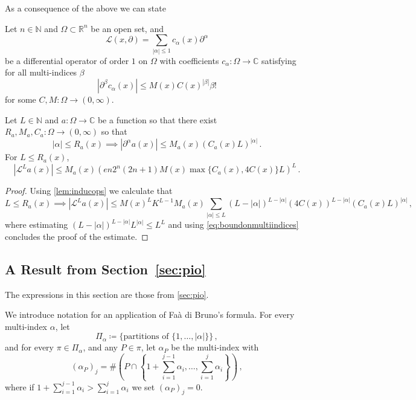 \documentclass[
	fontsize=11pt, 
	twoside=false, 
	abstract=true, 
	a4paper,
]{scrartcl}
\newcommand{\RR}{\mathbb{R}}
\newcommand{\CC}{\mathbb{C}}
\newcommand{\abs}[1]{\left\lvert#1\right\rvert}
\newcommand{\del}{\partial}
\begin{document}
As a consequence of the above we can state
\begin{corollary}\label{cor:repeatL}
	Let $n\in\mathbb{N}$ and $\Omega \subset \RR^n$ be an open set, and
	\[
		\mathcal{L}(x,\del) = \sum_{\abs{\alpha}\leq 1} c_{\alpha}(x)\del^\alpha
	\]
	be a differential operator of order $1$ on $\Omega$ with coefficients $c_{\alpha} \colon \Omega\to \CC$ satisfying for all multi-indices $\beta$
	\[
		\abs{\del^\beta c_{\alpha}(x)} \leq M(x) C(x)^{\abs{\beta}} \beta!
	\]
	for some $C,M\colon \Omega \to (0,\infty)$.

	Let $L\in\mathbb{N}$ and $a \colon \Omega \to \CC$ be a function so that there exist $R_a,M_a,C_a \colon \Omega \to (0,\infty)$ so that
	\[
		\abs{\alpha}\leq R_a(x)\implies \abs{\del^\alpha a(x)} \leq M_a(x) (C_a(x)L)^{\abs{\alpha}}\,.
	\]
	For $L\leq R_a(x)$,
	\[
		\abs{\mathcal{L}^L a(x)} \leq M_a(x) \left(en2^n(2n+1) M(x) \max\{C_a(x), 4C(x)\}L\right)^L\,.
	\]
\end{corollary}
\begin{proof}
	Using \cref{lem:inducops} we calculate that 
	\[ 
		L \leq R_a(x)\implies \abs{\mathcal{L}^L a(x)} \leq M(x)^L K^{L-1}M_a(x) \sum_{\abs{\alpha}\leq L} (L-\abs{\alpha})^{L-\abs{\alpha}}(4C(x))^{L-\abs{\alpha}} (C_a(x) L)^{\abs{\alpha}}\,,
	\]
	where estimating $(L-\abs{\alpha})^{L-\abs{\alpha}}L^{\abs{\alpha}} \leq L^L$ and using \cref{eq:boundonmultiindices} concludes the proof of the estimate.
\end{proof}

\subsection{A Result from Section~\ref{sec:pio}}\label{sec:proofspio}

The expressions in this section are those from \cref{sec:pio}. 

We introduce notation for an application of Fa\`a di Bruno's formula. For every multi-index $\alpha$, let
\begin{equation}\label{eq:defPialpha}
	\Pi_\alpha \coloneqq \{\text{partitions of } \{1,\dots,\abs{\alpha}\}\}\,,
\end{equation}
and for every $\pi \in \Pi_\alpha$, and any $P \in \pi$, let $\alpha_P$ be the multi-index with 
\begin{equation}
	(\alpha_P)_j = \#\left(P\cap \left\{1+\sum_{i=1}^{j-1} \alpha_i, \dots, \sum_{i=1}^{j}\alpha_i\right\}\right)\,,\label{eq:faaindex}
\end{equation}
where if $1+\sum_{i=1}^{j-1} \alpha_i > \sum_{i=1}^{j}\alpha_i$ we set $(\alpha_P)_j = 0$.
\end{document}
